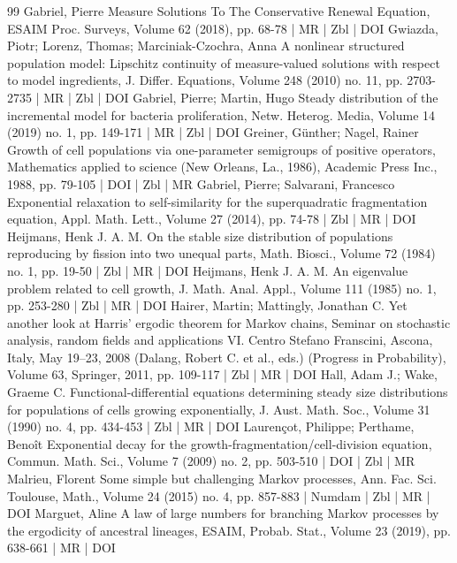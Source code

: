 \begin{thebibliography}{99}
Gabriel, Pierre Measure Solutions To The Conservative Renewal Equation, ESAIM Proc. Surveys, Volume 62 (2018), pp. 68-78 | MR | Zbl | DOI
Gwiazda, Piotr; Lorenz, Thomas; Marciniak-Czochra, Anna A nonlinear structured population model: Lipschitz continuity of measure-valued solutions with respect to model ingredients, J. Differ. Equations, Volume 248 (2010) no. 11, pp. 2703-2735 | MR | Zbl | DOI
Gabriel, Pierre; Martin, Hugo Steady distribution of the incremental model for bacteria proliferation, Netw. Heterog. Media, Volume 14 (2019) no. 1, pp. 149-171 | MR | Zbl | DOI
Greiner, Günther; Nagel, Rainer Growth of cell populations via one-parameter semigroups of positive operators, Mathematics applied to science (New Orleans, La., 1986), Academic Press Inc., 1988, pp. 79-105 | DOI | Zbl | MR
Gabriel, Pierre; Salvarani, Francesco Exponential relaxation to self-similarity for the superquadratic fragmentation equation, Appl. Math. Lett., Volume 27 (2014), pp. 74-78 | Zbl | MR | DOI
Heijmans, Henk J. A. M. On the stable size distribution of populations reproducing by fission into two unequal parts, Math. Biosci., Volume 72 (1984) no. 1, pp. 19-50 | Zbl | MR | DOI
Heijmans, Henk J. A. M. An eigenvalue problem related to cell growth, J. Math. Anal. Appl., Volume 111 (1985) no. 1, pp. 253-280 | Zbl | MR | DOI
Hairer, Martin; Mattingly, Jonathan C. Yet another look at Harris’ ergodic theorem for Markov chains, Seminar on stochastic analysis, random fields and applications VI. Centro Stefano Franscini, Ascona, Italy, May 19–23, 2008 (Dalang, Robert C. et al., eds.) (Progress in Probability), Volume 63, Springer, 2011, pp. 109-117 | Zbl | MR | DOI
Hall, Adam J.; Wake, Graeme C. Functional-differential equations determining steady size distributions for populations of cells growing exponentially, J. Aust. Math. Soc., Volume 31 (1990) no. 4, pp. 434-453 | Zbl | MR | DOI
Laurençot, Philippe; Perthame, Benoît Exponential decay for the growth-fragmentation/cell-division equation, Commun. Math. Sci., Volume 7 (2009) no. 2, pp. 503-510 | DOI | Zbl | MR
Malrieu, Florent Some simple but challenging Markov processes, Ann. Fac. Sci. Toulouse, Math., Volume 24 (2015) no. 4, pp. 857-883 | Numdam | Zbl | MR | DOI
Marguet, Aline A law of large numbers for branching Markov processes by the ergodicity of ancestral lineages, ESAIM, Probab. Stat., Volume 23 (2019), pp. 638-661 | MR | DOI

\end{thebibliography}
